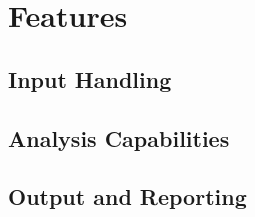 \newpage
\section{Features}

\subsection{Input Handling}
\subsection{Analysis Capabilities}
\subsection{Output and Reporting}